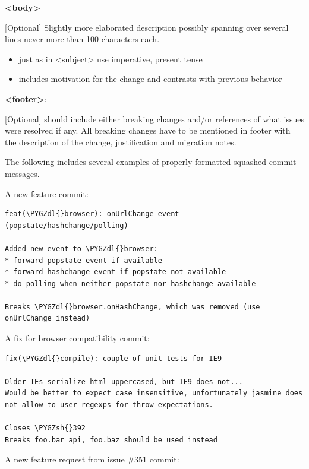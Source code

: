 \documentclass[letterpaper,10pt,english]{sphinxmanual}
\def\PYGZsh{\char`\#}
\def\PYGZdl{\char`\$}
\begin{document}
\textbf{\textless{}body\textgreater{}}

{[}Optional{]} Slightly more elaborated description possibly spanning over several
lines never more than 100 characters each.
\begin{itemize}
\item {} 
just as in \textless{}subject\textgreater{} use imperative, present tense

\item {} 
includes motivation for the change and contrasts with previous behavior

\end{itemize}

\textbf{\textless{}footer\textgreater{}}:

{[}Optional{]} should include either breaking changes and/or references of
what issues were resolved if any. All breaking changes have to be
mentioned in footer with the description of the change, justification
and migration notes.

The following includes several examples of properly formatted squashed
commit messages.

A new feature commit:

\begin{Verbatim}[commandchars=\\\{\}]
feat(\PYGZdl{}browser): onUrlChange event (popstate/hashchange/polling)

Added new event to \PYGZdl{}browser:
* forward popstate event if available
* forward hashchange event if popstate not available
* do polling when neither popstate nor hashchange available

Breaks \PYGZdl{}browser.onHashChange, which was removed (use onUrlChange instead)
\end{Verbatim}

A fix for browser compatibility commit:

\begin{Verbatim}[commandchars=\\\{\}]
fix(\PYGZdl{}compile): couple of unit tests for IE9

Older IEs serialize html uppercased, but IE9 does not...
Would be better to expect case insensitive, unfortunately jasmine does
not allow to user regexps for throw expectations.

Closes \PYGZsh{}392
Breaks foo.bar api, foo.baz should be used instead
\end{Verbatim}

A new feature request from issue \#351 commit:
\end{document}
